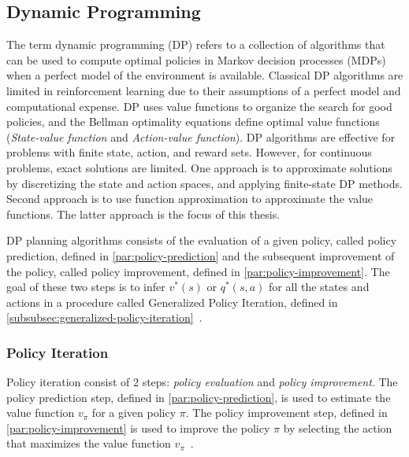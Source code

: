 \documentclass[../xlapes02]{subfiles}
\begin{document}
    \subsection{Dynamic Programming}\label{subsec:dynamic-programming}
    The term dynamic programming (DP) refers to a collection of algorithms that can be used to compute optimal policies in Markov decision processes (MDPs) when a perfect model of the environment is available. Classical DP algorithms are limited in reinforcement learning due to their assumptions of a perfect model and computational expense. DP uses value functions to organize the search for good policies, and the Bellman optimality equations define optimal value functions (\emph{State-value function} and \emph{Action-value function}). DP algorithms are effective for problems with finite state, action, and reward sets. However, for continuous problems, exact solutions are limited. One approach is to approximate solutions by discretizing the state and action spaces, and applying finite-state DP methods. Second approach is to use function approximation to approximate the value functions. The latter approach is the focus of this thesis.

    DP planning algorithms consists of the evaluation of a given policy, called policy prediction, defined in \cref{par:policy-prediction} and the subsequent improvement of the policy, called policy improvement, defined in \cref{par:policy-improvement}. The goal of these two steps is to infer $v^*(s)$ or $q^*(s,a)$ for all the states and actions in a procedure called Generalized Policy Iteration, defined in \cref{subsubsec:generalized-policy-iteration}~\cite{sutton2018reinforcement, FITMT25127}.

    \subsubsection{Policy Iteration}\label{subsubsec:policy-iteration}
    Policy iteration consist of 2 steps: \emph{policy evaluation} and \emph{policy improvement}. The policy prediction step, defined in \cref{par:policy-prediction}, is used to estimate the value function $v_{\pi}$ for a given policy $\pi$. The policy improvement step, defined in \cref{par:policy-improvement} is used to improve the policy $\pi$ by selecting the action that maximizes the value function $v_{\pi}$~\cite{sutton2018reinforcement}.
\end{document}
